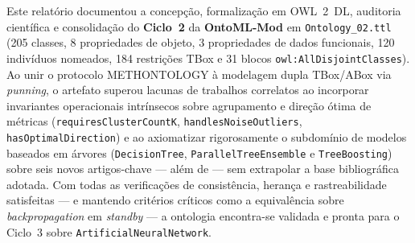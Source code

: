 \documentclass[11pt,a4paper]{article}
\newcommand{\onto}[1]{\texttt{#1}}
\begin{document}
Este relatório documentou a concepção, formalização em OWL~2~DL, auditoria científica e consolidação do \textbf{Ciclo~2} da \textbf{OntoML-Mod} em \texttt{Ontology\_02.ttl} (205 classes, 8 propriedades de objeto, 3 propriedades de dados funcionais, 120 indivíduos nomeados, 184 restrições TBox e 31 blocos \onto{owl:AllDisjointClasses}). Ao unir o protocolo METHONTOLOGY à modelagem dupla TBox/ABox via \emph{punning}, o artefato superou lacunas de trabalhos correlatos ao incorporar invariantes operacionais intrínsecos sobre agrupamento e direção ótima de métricas (\onto{requiresClusterCountK}, \onto{handlesNoiseOutliers}, \onto{hasOptimalDirection}) e ao axiomatizar rigorosamente o subdomínio de modelos baseados em árvores (\onto{DecisionTree}, \onto{ParallelTreeEnsemble} e \onto{TreeBoosting}) sobre seis novos artigos-chave --- além de \cite{sarker2021ml} --- sem extrapolar a base bibliográfica adotada. Com todas as verificações de consistência, herança e rastreabilidade satisfeitas --- e mantendo critérios críticos como a equivalência sobre \emph{backpropagation} em \emph{standby} --- a ontologia encontra-se validada e pronta para o Ciclo~3 sobre \onto{ArtificialNeuralNetwork}.
\end{document}
